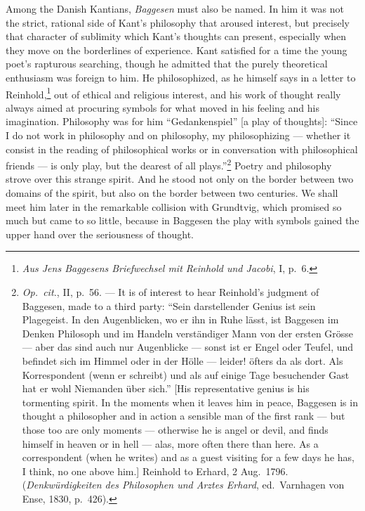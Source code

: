 \documentclass[12pt,a4paper]{book}
\newcommand{\opage}[1]{\marginnote{\footnotesize\textit{[#1]}}}
\begin{document}
Among the Danish Kantians, \emph{Baggesen} must also be named. In him it was not the
strict, rational side of Kant's philosophy that aroused interest, but precisely
that character of sublimity which Kant's thoughts can present, especially when they
move on the borderlines of experience. Kant satisfied for a time the young poet's
rapturous searching, though he admitted that the purely theoretical enthusiasm was
foreign to him. He philosophized, as he himself says in a letter to
Reinhold,\footnote{\emph{Aus Jens Baggesens Briefwechsel mit Reinhold und Jacobi},
I, p.~6.} out of ethical and religious interest, and his work of thought really
always aimed at procuring symbols for what moved in his feeling and his
imagination. Philosophy was for him ``Gedankenspiel'' [a play of thoughts]:
``Since I do not work in philosophy and on philosophy, my philosophizing ---
whether it consist in the reading of philosophical works or in conversation with
philosophical friends --- is only play, but the dearest of all plays.''\footnote{\emph{Op.\
cit.}, II, p.~56. --- It is of interest to hear Reinhold's judgment of Baggesen,
made to a third party: ``Sein darstellender Genius ist sein Plagegeist. In den
Augenblicken, wo er ihn in Ruhe lässt, ist Baggesen im Denken Philosoph und im
Handeln verständiger Mann von der ersten Grösse --- aber das sind auch nur
Augenblicke --- sonst ist er Engel oder Teufel, und befindet sich im Himmel oder in
der Hölle --- leider! öfters da als dort. Als Korrespondent (wenn er schreibt) und
als auf einige Tage besuchender Gast hat er wohl Niemanden über sich.'' [His
representative genius is his tormenting spirit. In the moments when it leaves him in
peace, Baggesen is in thought a philosopher and in action a sensible man of the
first rank --- but those too are only moments --- otherwise he is angel or devil,
and finds himself in heaven or in hell --- alas, more often there than here. As a
correspondent (when he writes) and as a guest visiting for a few days he has, I
think, no one above him.] Reinhold to Erhard, 2 Aug.\ 1796.
(\emph{Denkwürdigkeiten des Philosophen und Arztes Erhard}, ed.\ Varnhagen von
Ense, 1830, p.~426).} Poetry and philosophy strove over this strange spirit. And he
stood not only on the border between two domains of the spirit, but also on \opage{30}the
border between two centuries. We shall meet him later in the remarkable collision
with Grundtvig, which promised so much but came to so little, because in Baggesen
the play with symbols gained the upper hand over the seriousness of thought.
\end{document}

